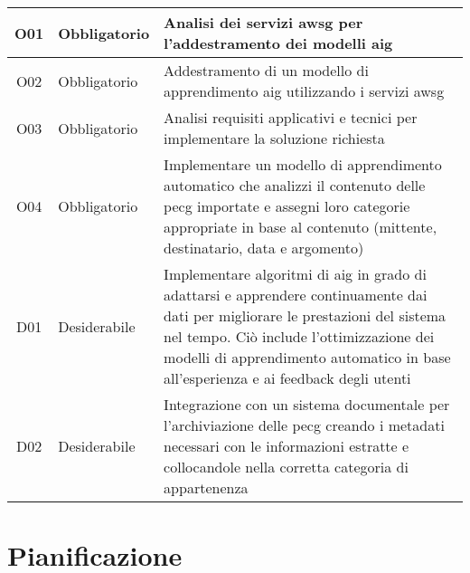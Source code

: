 \begin{longtable}{|c|p{4cm}|p{10cm}|}
    O01          & Obbligatorio                                                     & Analisi dei servizi \gls{awsg} per l'addestramento dei modelli \gls{aig}
    \\ \hline O02 & Obbligatorio & Addestramento di un modello di apprendimento \gls{aig}
    utilizzando i servizi \gls{awsg}                                                                                                                    \\ \hline O03 & Obbligatorio & Analisi requisiti
    applicativi e tecnici per implementare la soluzione richiesta                                                                                \\ \hline O04   &
    Obbligatorio & Implementare un modello di apprendimento automatico che analizzi
       il contenuto delle \gls{pecg} importate e assegni loro categorie appropriate in base
    al contenuto (mittente, destinatario, data e argomento)                                                                                      \\ \hline D01   &
    Desiderabile & Implementare algoritmi di \gls{aig} in grado di adattarsi e apprendere
       continuamente dai dati per migliorare le prestazioni del sistema nel tempo. Ciò
       include l'ottimizzazione dei modelli di apprendimento automatico in base
    all'esperienza e ai feedback degli utenti                                                                                                    \\ \hline D02 & Desiderabile &
       Integrazione con un sistema documentale per l’archiviazione delle \gls{pecg} creando i
       metadati necessari con le informazioni estratte e collocandole nella corretta
    categoria di appartenenza                                                                                                                    \\ \hline
\end{longtable}

\section{Pianificazione}
